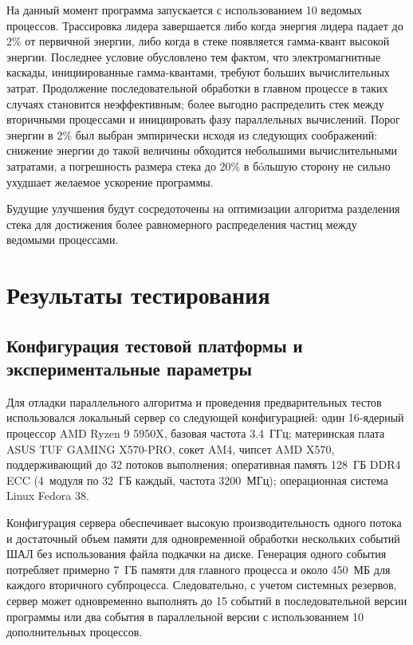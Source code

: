 \documentclass[aps,preprint,showpacs,aps,amsmath,showkeys,nobibnotes,nofootinbib,footnotes,superscriptaddress]{revtex4-2}
\begin{document}
На данный момент программа запускается с использованием 10 ведомых процессов. Трассировка лидера завершается либо когда энергия лидера падает до 2\% от первичной энергии, либо когда в стеке появляется гамма-квант высокой энергии. Последнее условие обусловлено тем фактом, что электромагнитные каскады, инициированные гамма-квантами, требуют больших вычислительных затрат. Продолжение последовательной обработки в главном процессе в таких случаях становится неэффективным; более выгодно распределить стек между вторичными процессами и инициировать фазу параллельных вычислений. Порог энергии в 2\% был выбран эмпирически исходя из следующих соображений: снижение энергии до такой величины обходится небольшими вычислительными затратами, а погрешность размера стека до 20\% в б\'oльшую сторону не сильно ухудшает желаемое ускорение программы.

Будущие улучшения будут сосредоточены на оптимизации алгоритма разделения стека для достижения более равномерного распределения частиц между ведомыми процессами.


\section{Результаты тестирования}
\subsection{Конфигурация тестовой платформы и экспериментальные параметры}
\label{subsec:test_platform}

Для отладки параллельного алгоритма и проведения предварительных тестов использовался локальный сервер со следующей конфигурацией:
один 16-ядерный процессор AMD Ryzen 9 5950X, базовая частота 3.4~ГГц;
материнская плата ASUS TUF GAMING X570-PRO, сокет AM4, чипсет AMD X570, поддерживающий до 32 потоков выполнения;
оперативная память 128~ГБ DDR4 ECC (4~модуля по 32~ГБ каждый, частота 3200~МГц);
операционная система Linux Fedora 38.

Конфигурация сервера обеспечивает высокую производительность одного потока и достаточный объем памяти для одновременной обработки нескольких событий ШАЛ без использования файла подкачки на диске. Генерация одного события потребляет примерно 7~ГБ памяти для главного процесса и около 450~МБ для каждого вторичного субпроцесса. Следовательно, с учетом системных резервов, сервер может одновременно выполнять до 15 событий в последовательной версии программы или два события в параллельной версии с использованием 10 дополнительных процессов.
\end{document}
